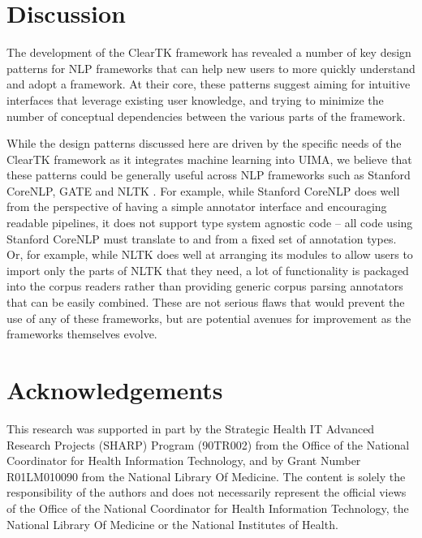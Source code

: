 \documentclass[10pt, a4paper]{article}
\begin{document}
\section{Discussion}
The development of the ClearTK framework has revealed a number of key design patterns for NLP frameworks that can help new users to more quickly understand and adopt a framework.
At their core, these patterns suggest aiming for intuitive interfaces that leverage existing user knowledge, and trying to minimize the number of conceptual dependencies between the various parts of the framework.

While the design patterns discussed here are driven by the specific needs of the ClearTK framework as it integrates machine learning into UIMA, we believe that these patterns could be generally useful across NLP frameworks such as Stanford CoreNLP, GATE and NLTK \cite{BirdKleinLoper09}.
For example, while Stanford CoreNLP does well from the perspective of having a simple annotator interface and encouraging readable pipelines, it does not support type system agnostic code -- all code using Stanford CoreNLP must translate to and from a fixed set of annotation types.
Or, for example, while NLTK does well at arranging its modules to allow users to import only the parts of NLTK that they need, a lot of functionality is packaged into the corpus readers rather than providing generic corpus parsing annotators that can be easily combined.
These are not serious flaws that would prevent the use of any of these frameworks, but are potential avenues for improvement as the frameworks themselves evolve.

\section{Acknowledgements}
This research was supported in part by the Strategic Health IT Advanced Research Projects (SHARP) Program (90TR002) from the Office of the National Coordinator for Health Information Technology, and by Grant Number R01LM010090 from the National Library Of Medicine. The content is solely the responsibility of the authors and does not necessarily represent the official views of the Office of the National Coordinator for Health Information Technology, the National Library Of Medicine or the National Institutes of Health.



\end{document}
